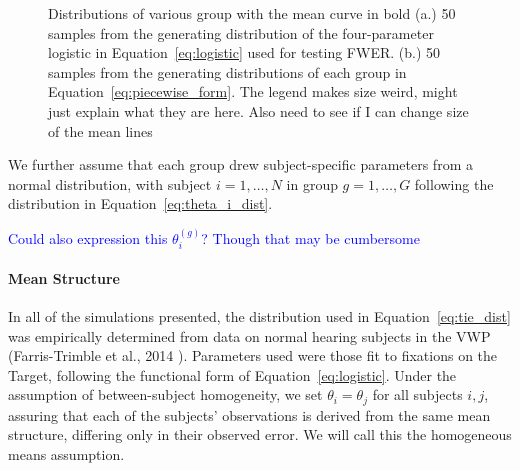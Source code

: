 \documentclass{article}
\providecommand{\cn}[1]{\textcolor{blue}{#1}}
\begin{document}
\begin{figure}
    \centering
    \caption{Distributions of various group with the mean curve in bold (a.) 50 samples from the generating distribution of the four-parameter logistic in Equation~\ref{eq:logistic} used for testing FWER. (b.) 50 samples from the generating distributions of each group in Equation~\ref{eq:piecewise_form}. The legend makes size weird, might just explain what they are here. Also need to see if I can change size of the mean lines}
\label{fig:distribution}
\end{figure}



We further assume that each group drew subject-specific parameters from a normal distribution, with subject $i = 1, \dots, N$ in group $g = 1, \dots, G$ following the distribution in Equation~\ref{eq:theta_i_dist}.

\cn{Could also expression this $\theta_i^{(g)}$? Though that may be cumbersome}

\paragraph{Mean Structure} In all of the simulations presented, the distribution used in Equation~\ref{eq:tie_dist} was empirically determined from data on normal hearing subjects in the VWP (Farris-Trimble et  al., 2014 \cite{FarrisTrimble2014}). Parameters used were those fit to fixations on the Target, following the functional form of Equation~\ref{eq:logistic}. Under the assumption of between-subject homogeneity, we set $\theta_i = \theta_j$ for all subjects $i,j$, assuring that each of the subjects' observations is derived from the same mean structure, differing only in their observed error. We will call this the homogeneous means assumption.
\end{document}
